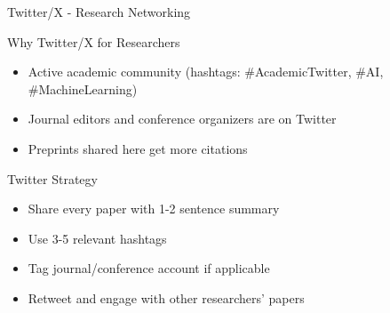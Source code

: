 \documentclass[11pt]{beamer}
\begin{document}
	
	\begin{frame}{Twitter/X - Research Networking}
		\scriptsize
		\begin{block}{Why Twitter/X for Researchers}
			\begin{itemize}
				\item Active academic community (hashtags: \#AcademicTwitter, \#AI, \#MachineLearning)
				\item Journal editors and conference organizers are on Twitter
				\item Preprints shared here get more citations
			\end{itemize}
		\end{block}
		\begin{block}{Twitter Strategy}
			\begin{itemize}
				\item Share every paper with 1-2 sentence summary
				\item Use 3-5 relevant hashtags
				\item Tag journal/conference account if applicable
				\item Retweet and engage with other researchers' papers
			\end{itemize}
		\end{block}
	\end{frame}
	
\end{document}

